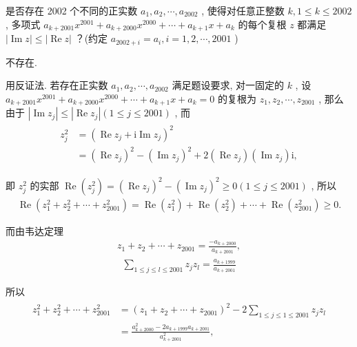 \begin{example}
	是否存在 2002 个不同的正实数 $a_1, a_2, \cdots, a_{2002}$ , 使得对任意正整数 $k, 1 \leqslant k \leqslant 2002$, 多项式 $a_{k+2001} x^{2001}+a_{k+2000} x^{2000}+\cdots+a_{k+1} x+a_k$ 的每个复根 $z$ 都满足 $|\operatorname{Im} z| \leqslant|\operatorname{Re} z|$ ？(约定 $a_{2002+i}=a_i, i=1,2, \cdots, 2001$ )
\end{example}
\begin{solution}
	不存在.

	用反证法. 若存在正实数 $a_1, a_2, \cdots, a_{2002}$ 满足题设要求, 对一固定的 $k$ , 设 $a_{k+2001} x^{2001}+a_{k+2000} x^{2000}+\cdots+a_{k+1} x+a_k=0$ 的复根为 $z_1, z_2, \cdots, z_{2001}$ , 那么由于 $\left|\operatorname{Im} z_j\right| \leqslant\left|\operatorname{Re} z_j\right|(1 \leqslant j \leqslant 2001)$ , 而
	\begin{align*}
		\begin{aligned}
			z_j^2 & =\left(\operatorname{Re} z_j+\mathrm{i} \operatorname{Im} z_j\right)^2                                                                                       \\
			      & =\left(\operatorname{Re} z_j\right)^2-\left(\operatorname{Im} z_j\right)^2+2\left(\operatorname{Re} z_j\right)\left(\operatorname{Im} z_j\right) \mathrm{i},
		\end{aligned}
	\end{align*}

	即 $z_j^2$ 的实部 $\operatorname{Re}\left(z_j^2\right)=\left(\operatorname{Re} z_j\right)^2-\left(\operatorname{Im} z_j\right)^2 \geqslant 0(1 \leqslant j \leqslant 2001)$ , 所以
	\begin{align*}
		\operatorname{Re}\left(z_1^2+z_2^2+\cdots+z_{2001}^2\right)=\operatorname{Re}\left(z_1^2\right)+\operatorname{Re}\left(z_2^2\right)+\cdots+\operatorname{Re}\left(z_{2001}^2\right) \geqslant 0 .
	\end{align*}

	而由韦达定理
	\begin{align*}
		z_1+z_2+\cdots+z_{2001}=\frac{-a_{k+2000}}{a_{k+2001}},
	\end{align*}
	\begin{align*}
		\sum_{1 \leqslant j \leqslant l \leqslant 2001} z_j z_l=\frac{a_{k+1999}}{a_{k+2001}}
	\end{align*}

	所以
	\begin{align*}
		\begin{aligned}
			z_1^2+z_2^2+\cdots+z_{2001}^2 & =\left(z_1+z_2+\cdots+z_{2001}\right)^2-2 \sum_{1 \leqslant j \leqslant 1 \leqslant 2001} z_j z_l \\
			                              & =\frac{a_{k+2000}^2-2 a_{k+1999} a_{k+2001}}{a_{k+2001}^2},
		\end{aligned}
	\end{align*}


\end{solution}
